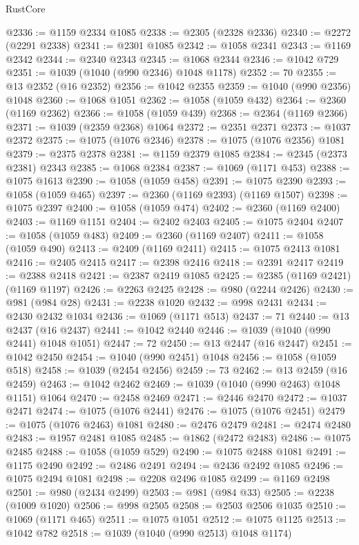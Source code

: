 \begin{lexlean}{RustCore}
\begin{coremodule}
@2336 := @1159 @2334 @1085
@2338 := @2305 (@2328 @2336)
@2340 := @2272 (@2291 @2338)
@2341 := @2301 @1085
@2342 := @1058 @2341
@2343 := @1169 @2342
@2344 := @2340 @2343
@2345 := @1068 @2344
@2346 := @1042 @729
@2351 := @1039 (@1040 (@990 @2346) @1048 @1178)
@2352 := 70
@2355 := @13 @2352 (@16 @2352)
@2356 := @1042 @2355
@2359 := @1040 (@990 @2356) @1048
@2360 := @1068 @1051
@2362 := @1058 (@1059 @432)
@2364 := @2360 (@1169 @2362)
@2366 := @1058 (@1059 @439)
@2368 := @2364 (@1169 @2366)
@2371 := @1039 (@2359 @2368) @1064
@2372 := @2351 @2371
@2373 := @1037 @2372
@2375 := @1075 (@1076 @2346)
@2378 := @1075 (@1076 @2356) @1081
@2379 := @2375 @2378
@2381 := @1159 @2379 @1085
@2384 := @2345 (@2373 @2381) @2343
@2385 := @1068 @2384
@2387 := @1069 (@1171 @453)
@2388 := @1075 @1613
@2390 := @1058 (@1059 @458)
@2391 := @1075 @2390
@2393 := @1058 (@1059 @465)
@2397 := @2360 (@1169 @2393) (@1169 @1507)
@2398 := @1075 @2397
@2400 := @1058 (@1059 @474)
@2402 := @2360 (@1169 @2400)
@2403 := @1169 @1151
@2404 := @2402 @2403
@2405 := @1075 @2404
@2407 := @1058 (@1059 @483)
@2409 := @2360 (@1169 @2407)
@2411 := @1058 (@1059 @490)
@2413 := @2409 (@1169 @2411)
@2415 := @1075 @2413 @1081
@2416 := @2405 @2415
@2417 := @2398 @2416
@2418 := @2391 @2417
@2419 := @2388 @2418
@2421 := @2387 @2419 @1085
@2425 := @2385 (@1169 @2421) (@1169 @1197)
@2426 := @2263 @2425
@2428 := @980 (@2244 @2426)
@2430 := @981 (@984 @28)
@2431 := @2238 @1020
@2432 := @998 @2431
@2434 := @2430 @2432 @1034
@2436 := @1069 (@1171 @513)
@2437 := 71
@2440 := @13 @2437 (@16 @2437)
@2441 := @1042 @2440
@2446 := @1039 (@1040 (@990 @2441) @1048 @1051)
@2447 := 72
@2450 := @13 @2447 (@16 @2447)
@2451 := @1042 @2450
@2454 := @1040 (@990 @2451) @1048
@2456 := @1058 (@1059 @518)
@2458 := @1039 (@2454 @2456)
@2459 := 73
@2462 := @13 @2459 (@16 @2459)
@2463 := @1042 @2462
@2469 := @1039 (@1040 (@990 @2463) @1048 @1151) @1064
@2470 := @2458 @2469
@2471 := @2446 @2470
@2472 := @1037 @2471
@2474 := @1075 (@1076 @2441)
@2476 := @1075 (@1076 @2451)
@2479 := @1075 (@1076 @2463) @1081
@2480 := @2476 @2479
@2481 := @2474 @2480
@2483 := @1957 @2481 @1085
@2485 := @1862 (@2472 @2483)
@2486 := @1075 @2485
@2488 := @1058 (@1059 @529)
@2490 := @1075 @2488 @1081
@2491 := @1175 @2490
@2492 := @2486 @2491
@2494 := @2436 @2492 @1085
@2496 := @1075 @2494 @1081
@2498 := @2208 @2496 @1085
@2499 := @1169 @2498
@2501 := @980 (@2434 @2499)
@2503 := @981 (@984 @33)
@2505 := @2238 (@1009 @1020)
@2506 := @998 @2505
@2508 := @2503 @2506 @1035
@2510 := @1069 (@1171 @465)
@2511 := @1075 @1051
@2512 := @1075 @1125
@2513 := @1042 @782
@2518 := @1039 (@1040 (@990 @2513) @1048 @1174)

\end{coremodule}
\end{lexlean}
